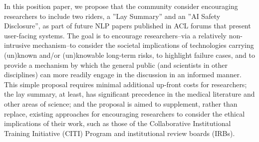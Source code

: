 In this position paper, we propose that the community consider encouraging researchers to include two riders, a ''Lay Summary'' and an ''AI Safety Disclosure'', as part of future NLP papers published in ACL forums that present user-facing systems. The goal is to encourage researchers--via a relatively non-intrusive mechanism--to consider the societal implications of technologies carrying (un)known and/or (un)knowable long-term risks, to highlight failure cases, and to provide a mechanism by which the general public (and scientists in other disciplines) can more readily engage in the discussion in an informed manner. This simple proposal requires minimal additional up-front costs for researchers; the lay summary, at least, has significant precedence in the medical literature and other areas of science; and the proposal is aimed to supplement, rather than replace, existing approaches for encouraging researchers to consider the ethical implications of their work, such as those of the Collaborative Institutional Training Initiative (CITI) Program and institutional review boards (IRBs).
